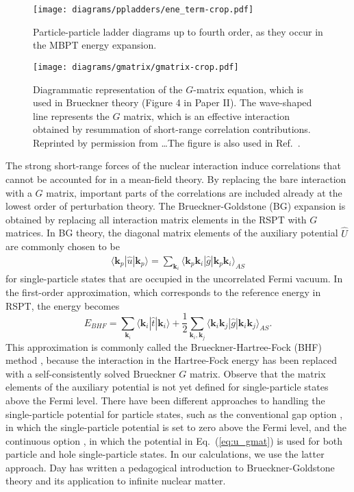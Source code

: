 \documentclass[a4paper,12pt]{report}
\begin{document}
\begin{figure}
  \centering
  \texttt{[image: diagrams/ppladders/ene\_term-crop.pdf]}
  \caption{Particle-particle ladder diagrams up to fourth order, as they occur in the MBPT energy expansion.}  
  \label{fig:ppladders}
\end{figure}

\begin{figure}
  \centering
  \texttt{[image: diagrams/gmatrix/gmatrix-crop.pdf]}
  \caption{Diagrammatic representation of the $G$-matrix equation, which is used in Brueckner theory \cite{brueckner_gammel,goldstone1957} (Figure 4 in Paper II). The wave-shaped line represents the $G$ matrix, which is an effective interaction obtained by resummation of short-range correlation contributions. Reprinted by permission from \dots  The figure is also used in Ref.~\cite{baardsen}.}  
  \label{fig:gmatrix}
\end{figure}

The strong short-range forces of the nuclear interaction induce correlations 
that cannot be accounted for in a mean-field theory. By replacing the bare 
interaction with a $G$ matrix, important parts of the correlations are included 
already at the lowest order of perturbation theory. The Brueckner-Goldstone 
(BG) expansion \cite{day1967} is obtained by replacing all interaction 
matrix elements in the RSPT with $G$ matrices. In BG theory, the diagonal 
matrix elements of the auxiliary potential $\hat{U}$ are commonly chosen to be 
\begin{align}
  \langle \mathbf{k}_{p}|\hat{u}|\mathbf{k}_{p}\rangle = \sum_{\mathbf{k}_{i}}\langle \mathbf{k}_{p}\mathbf{k}_{i}|\hat{g}|\mathbf{k}_{p}\mathbf{k}_{i}\rangle_{AS} 
  \label{eq:u_gmat}
\end{align}
for single-particle states that are occupied in the uncorrelated Fermi vacuum. 
In the first-order approximation, which corresponds to the reference energy 
in RSPT, the energy becomes
\begin{equation}
  E_{BHF} = \sum_{\mathbf{k}_{i}}\langle \mathbf{k}_{i}|\hat{t}|\mathbf{k}_{i}\rangle + \frac{1}{2}\sum_{\mathbf{k}_{i},\mathbf{k}_{j}}\langle \mathbf{k}_{i}\mathbf{k}_{j}|\hat{g}|\mathbf{k}_{i}\mathbf{k}_{j}\rangle_{AS}.
  \label{eq:ene_bhf}
\end{equation}
This approximation is commonly called the Brueckner-Hartree-Fock (BHF) 
method \cite{hjensen1995}, because the interaction in the 
Hartree-Fock energy has been replaced with a self-consistently solved 
Brueckner $G$ matrix. Observe that the 
matrix elements of the auxiliary potential is not yet defined for 
single-particle states above the Fermi level. There have been different
approaches to handling the single-particle potential for particle
states, such as the conventional gap option \cite{hjensen1995}, in which
the single-particle potential is set to zero above the Fermi level,
and the continuous option \cite{mahaux1985,mahaux1989}, in which the 
potential in Eq.~(\ref{eq:u_gmat}) is used for both particle and 
hole single-particle states. In our calculations, we use the latter 
approach. Day has written a pedagogical introduction \cite{day1967} 
to Brueckner-Goldstone theory and its application to infinite nuclear matter.
\end{document}
